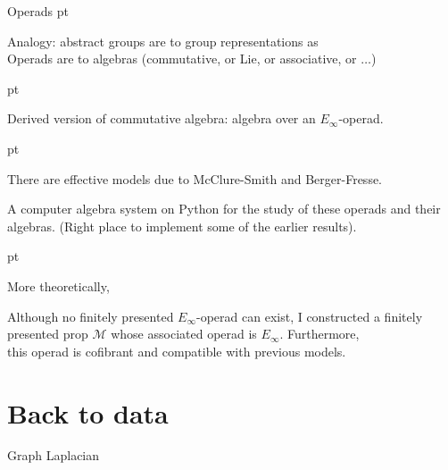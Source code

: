 {\begin{frame}{Operads}
		 pt
		\pause

		\textcolor{pblue}{Analogy}:	abstract groups are to group representations as	\\
		Operads are to algebras (commutative, or Lie, or associative, or $\dots$)

		 pt
		\pause

		\textcolor{pblue}{Derived version} of commutative algebra: algebra over an $E_\infty$-operad.

		 pt
		\pause

		There are effective models due to McClure-Smith and Berger-Fresse.

		\pause

		\begin{result}[M-M]
			A computer algebra system on Python for the study of these operads and their algebras. (Right place to implement some of the earlier results).
		\end{result}

		 pt
		\pause

		More theoretically,

		\begin{result}[M-M]
			Although no finitely presented $E_\infty$-operad can exist, I constructed a finitely presented prop $\mathcal M$ whose associated operad is $E_\infty$. Furthermore, \\
			this operad is cofibrant and compatible with previous models.
		\end{result}
	\end{frame}

	\section{Back to data}

	\begin{frame}{Graph Laplacian}

\end{frame}}
